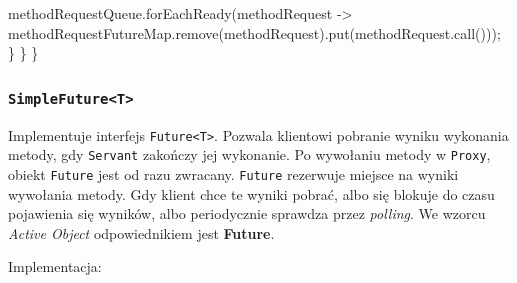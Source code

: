 \documentclass[11pt]{article}
\newenvironment{Shaded}{}{}
\newcommand{\FunctionTok}[1]{\textcolor[rgb]{0.02,0.16,0.49}{{#1}}}
\newcommand{\NormalTok}[1]{{#1}}
\newcommand{\OperatorTok}[1]{\textcolor[rgb]{0.40,0.40,0.40}{{#1}}}
\begin{document}
\begin{Shaded}
\begin{Highlighting}[]
\NormalTok{            methodRequestQueue}\OperatorTok{.}\FunctionTok{forEachReady}\OperatorTok{(}\NormalTok{methodRequest }\OperatorTok{{-}\textgreater{}}
\NormalTok{                methodRequestFutureMap}\OperatorTok{.}\FunctionTok{remove}\OperatorTok{(}\NormalTok{methodRequest}\OperatorTok{).}\FunctionTok{put}\OperatorTok{(}\NormalTok{methodRequest}\OperatorTok{.}\FunctionTok{call}\OperatorTok{()));}
        \OperatorTok{\}}
    \OperatorTok{\}}
\OperatorTok{\}}
\end{Highlighting}
\end{Shaded}

    \hypertarget{simplefuturet}{%
\subsubsection{\texorpdfstring{\texttt{SimpleFuture\textless{}T\textgreater{}}}{SimpleFuture\textless T\textgreater{}}}\label{simplefuturet}}

Implementuje interfejs \texttt{Future\textless{}T\textgreater{}}.
Pozwala klientowi pobranie wyniku wykonania metody, gdy \texttt{Servant}
zakończy jej wykonanie. Po wywołaniu metody w \texttt{Proxy}, obiekt
\texttt{Future} jest od razu zwracany. \texttt{Future} rezerwuje miejsce
na wyniki wywołania metody. Gdy klient chce te wyniki pobrać, albo się
blokuje do czasu pojawienia się wyników, albo periodycznie sprawdza
przez \emph{polling}. We wzorcu \emph{Active Object} odpowiednikiem jest
\textbf{Future}.

Implementacja:
\end{document}
